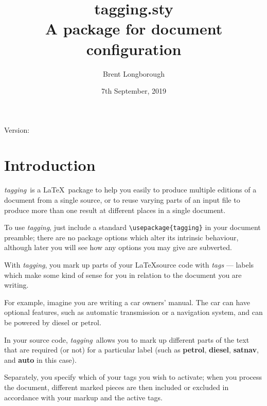 \documentclass[a4paper,12pt,twoside,openany]{memoir}
\newcommand{\tpn}{tagging}
\newcommand{\tpfname}{\textsf{\tpn.sty}}
\newcommand{\tpname}{\textsf{\itshape \tpn}}
\newcommand{\gitVtagn}{\space1.1}
\begin{document}
\title{%
	\Huge \tpfname\\[2ex]%
	\Large A package for document configuration
	}
\author{Brent Longborough}
\date{7th September, 2019}
\maketitle

{\centering
Version:\gitVtagn\\
}
\begingroup
{}
\setlength{\afterchapskip}{20pt}
\let\clearpage\relax
\let\chaptitlefont\Large\bfseries
\vspace*{5\baselineskip}
\tableofcontents*
\clearpage
\endgroup
\chapter{Introduction}
\tpname\ is a \LaTeX\ package to help you easily to
produce multiple editions of a document from a single source,
or to reuse varying parts of an input file
to produce more than one result at different places
in a single document.

To use \tpname, just include a standard
\verb!\usepackage{tagging}!  in your document preamble; there
are no package options which alter its intrinsic behaviour,
although later you will see how any options you may give are
subverted.

With \tpname, you mark up parts of your
\LaTeX source code with \textit{tags} --- labels which
make some kind of sense for you in relation to
the document you are writing.

For example, imagine you are writing a car owners' manual.
The car can have optional features, such as automatic transmission
or a navigation system, and can be powered by diesel or petrol.

In your source code, \tpname\ allows you to
mark up different parts of the text that
are required (or not) for a particular label
(such as \textbf{petrol}, \textbf{diesel}, \textbf{satnav},
and \textbf{auto} in this case).

Separately, you specify which of your tags you wish to activate;
when you process the document, different marked pieces are then
included or excluded in accordance with your markup
and the active tags.
\end{document}
